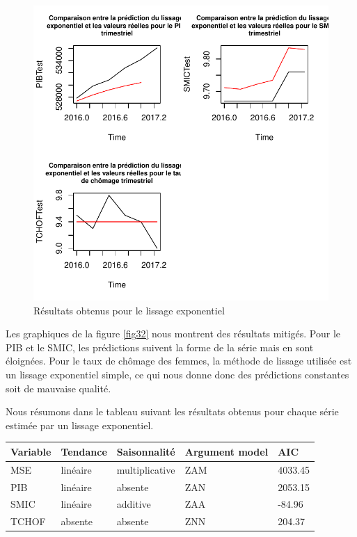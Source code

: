 \documentclass[11pt,]{article}
\begin{document}
\begin{figure}

{\centering \includegraphics{doc_files/figure-latex/unnamed-chunk-53-1} 

}

\caption{\label{fig32} Résultats obtenus pour le lissage exponentiel}\label{fig:unnamed-chunk-53}
\end{figure}

Les graphiques de la figure \ref{fig32} nous montrent des résultats
mitigés. Pour le PIB et le SMIC, les prédictions suivent la forme de la
série mais en sont éloignées. Pour le taux de chômage des femmes, la
méthode de lissage utilisée est un lissage exponentiel simple, ce qui
nous donne donc des prédictions constantes soit de mauvaise qualité.

Nous résumons dans le tableau suivant les résultats obtenus pour chaque
série estimée par un lissage exponentiel.

\begin{longtable}[]{@{}lllll@{}}
\toprule
Variable & Tendance & Saisonnalité & Argument model & AIC\tabularnewline
\midrule
\endhead
MSE & linéaire & multiplicative & ZAM & 4033.45\tabularnewline
PIB & linéaire & absente & ZAN & 2053.15\tabularnewline
SMIC & linéaire & additive & ZAA & -84.96\tabularnewline
TCHOF & absente & absente & ZNN & 204.37\tabularnewline
\bottomrule
\end{longtable}
\end{document}
